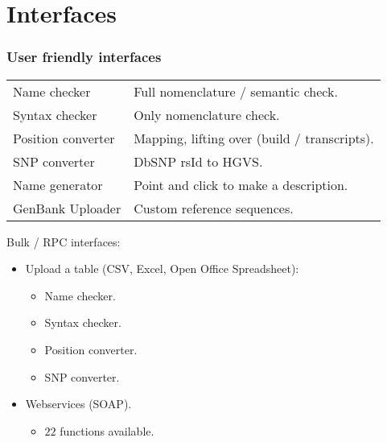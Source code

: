 \section{Interfaces}
\begin{frame}
  \frametitle{User friendly interfaces}

  \begin{tabular}{l@{\ \ -\ \ }l}
    Name checker       & Full nomenclature / semantic check.\\
    Syntax checker     & Only nomenclature check.\\
    Position converter & Mapping, lifting over (build / transcripts).\\
    SNP converter      & DbSNP rsId to HGVS.\\
    Name generator     & Point and click to make a description.\\
    GenBank Uploader   & Custom reference sequences.
  \end{tabular}
  \pause
  \bigskip

  Bulk / RPC interfaces:
  \begin{itemize}
    \item Upload a table (CSV, Excel, Open Office Spreadsheet):
    \begin{itemize}
      \item Name checker.
      \item Syntax checker.
      \item Position converter.
      \item SNP converter.
    \end{itemize}
    \item Webservices (SOAP).
    \begin{itemize}
      \item $22$ functions available.
    \end{itemize}
  \end{itemize}
\end{frame}
